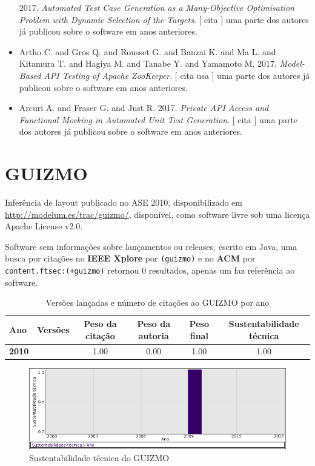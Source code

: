 \begin{itemize}
      2017.
        \textit{ Automated Test Case Generation as a Many-Objective Optimisation Problem with Dynamic Selection of the Targets}.
      [
          cita
      ]
uma parte dos autores já publicou sobre o software em anos anteriores.
\item Artho C. and Gros Q. and Rousset G. and Banzai K. and Ma L. and Kitamura T. and Hagiya M. and Tanabe Y. and Yamamoto M.
      2017.
        \textit{ Model-Based API Testing of Apache ZooKeeper}.
      [
          cita
          usa
      ]
uma parte dos autores já publicou sobre o software em anos anteriores.
\item Arcuri A. and Fraser G. and Just R.
      2017.
        \textit{ Private API Access and Functional Mocking in Automated Unit Test Generation}.
      [
          cita
      ]
uma parte dos autores já publicou sobre o software em anos anteriores.
\end{itemize}
\section{GUIZMO}

Inferência de layout
publicado no ASE 2010,
disponibilizado em \url{http://modelum.es/trac/guizmo/},
disponível,
como software livre
sob uma licença Apache License v2.0.

Software sem informações sobre lançamentos ou releases,
escrito em Java,
uma busca por citações no {\bf IEEE Xplore} por
\texttt{(guizmo)}
e no {\bf ACM} por
\texttt{content.ftsec:(+guizmo)}
retornou
0 resultados,
apenas um faz referência ao software.


\begin{table}[H]
\caption{Versões lançadas e número de citações ao GUIZMO por ano}
\centering
\begin{tabular}{| l | c | c | c | c | c |}
  \hline
  Ano & Versões & Peso da citação & Peso da autoria & Peso final & Sustentabilidade técnica \\
  \hline
            {\bf 2010}
          &
          
          &
          1.00
          &
          0.00
          &
          1.00
          &
            {\color{blue} 1.00}
          \\
\hline
\end{tabular}
\end{table}

\begin{figure}[h]
  \center
  \includegraphics[scale=0.50]{imagens/softwares-charts/guizmo.png}
  \caption{Sustentabilidade técnica do GUIZMO}
\end{figure}


